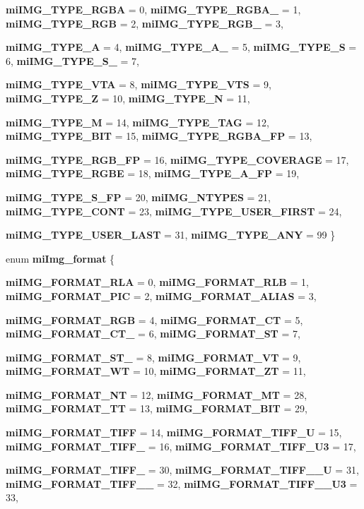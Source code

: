 \begin{CompactItemize}
{\bf mi\-IMG\_\-TYPE\_\-RGBA} =  0, 
{\bf mi\-IMG\_\-TYPE\_\-RGBA\_} =  1, 
{\bf mi\-IMG\_\-TYPE\_\-RGB} =  2, 
{\bf mi\-IMG\_\-TYPE\_\-RGB\_} =  3, 
\par
{\bf mi\-IMG\_\-TYPE\_\-A} =  4, 
{\bf mi\-IMG\_\-TYPE\_\-A\_} =  5, 
{\bf mi\-IMG\_\-TYPE\_\-S} =  6, 
{\bf mi\-IMG\_\-TYPE\_\-S\_} =  7, 
\par
{\bf mi\-IMG\_\-TYPE\_\-VTA} =  8, 
{\bf mi\-IMG\_\-TYPE\_\-VTS} =  9, 
{\bf mi\-IMG\_\-TYPE\_\-Z} =  10, 
{\bf mi\-IMG\_\-TYPE\_\-N} =  11, 
\par
{\bf mi\-IMG\_\-TYPE\_\-M} =  14, 
{\bf mi\-IMG\_\-TYPE\_\-TAG} =  12, 
{\bf mi\-IMG\_\-TYPE\_\-BIT} =  15, 
{\bf mi\-IMG\_\-TYPE\_\-RGBA\_\-FP} =  13, 
\par
{\bf mi\-IMG\_\-TYPE\_\-RGB\_\-FP} =  16, 
{\bf mi\-IMG\_\-TYPE\_\-COVERAGE} =  17, 
{\bf mi\-IMG\_\-TYPE\_\-RGBE} =  18, 
{\bf mi\-IMG\_\-TYPE\_\-A\_\-FP} =  19, 
\par
{\bf mi\-IMG\_\-TYPE\_\-S\_\-FP} =  20, 
{\bf mi\-IMG\_\-NTYPES} =  21, 
{\bf mi\-IMG\_\-TYPE\_\-CONT} =  23, 
{\bf mi\-IMG\_\-TYPE\_\-USER\_\-FIRST} =  24, 
\par
{\bf mi\-IMG\_\-TYPE\_\-USER\_\-LAST} =  31, 
{\bf mi\-IMG\_\-TYPE\_\-ANY} =  99
 \}
\item 
enum {\bf mi\-Img\_\-format} \{ \par
{\bf mi\-IMG\_\-FORMAT\_\-RLA} =  0, 
{\bf mi\-IMG\_\-FORMAT\_\-RLB} =  1, 
{\bf mi\-IMG\_\-FORMAT\_\-PIC} =  2, 
{\bf mi\-IMG\_\-FORMAT\_\-ALIAS} =  3, 
\par
{\bf mi\-IMG\_\-FORMAT\_\-RGB} =  4, 
{\bf mi\-IMG\_\-FORMAT\_\-CT} =  5, 
{\bf mi\-IMG\_\-FORMAT\_\-CT\_} =  6, 
{\bf mi\-IMG\_\-FORMAT\_\-ST} =  7, 
\par
{\bf mi\-IMG\_\-FORMAT\_\-ST\_} =  8, 
{\bf mi\-IMG\_\-FORMAT\_\-VT} =  9, 
{\bf mi\-IMG\_\-FORMAT\_\-WT} =  10, 
{\bf mi\-IMG\_\-FORMAT\_\-ZT} =  11, 
\par
{\bf mi\-IMG\_\-FORMAT\_\-NT} =  12, 
{\bf mi\-IMG\_\-FORMAT\_\-MT} =  28, 
{\bf mi\-IMG\_\-FORMAT\_\-TT} =  13, 
{\bf mi\-IMG\_\-FORMAT\_\-BIT} =  29, 
\par
{\bf mi\-IMG\_\-FORMAT\_\-TIFF} =  14, 
{\bf mi\-IMG\_\-FORMAT\_\-TIFF\_\-U} =  15, 
{\bf mi\-IMG\_\-FORMAT\_\-TIFF\_} =  16, 
{\bf mi\-IMG\_\-FORMAT\_\-TIFF\_\-U3} =  17, 
\par
{\bf mi\-IMG\_\-FORMAT\_\-TIFF\_} =  30, 
{\bf mi\-IMG\_\-FORMAT\_\-TIFF\_\_\-U} =  31, 
{\bf mi\-IMG\_\-FORMAT\_\-TIFF\_\_} =  32, 
{\bf mi\-IMG\_\-FORMAT\_\-TIFF\_\_\-U3} =  33, 

\end{CompactItemize}

